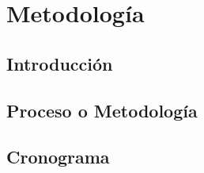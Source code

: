 \chapter{Metodología}
\section{Introducción}

\newpage

\section{Proceso o Metodología}

\newpage

\section{Cronograma}

\newpage